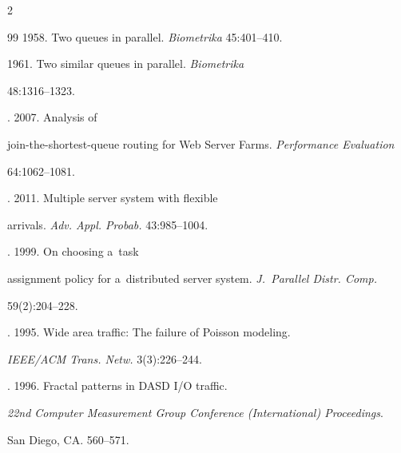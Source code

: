 \begin{multicols}{2}
{{\begin{thebibliography}{99}
     1958. Two queues in parallel. \textit{Biometrika} 45:401--410.


    




     1961. Two similar queues in parallel. \textit{Biometrika} 


48:1316--1323.





   




    . 2007. Analysis of 


    join-the-shortest-queue routing for Web Server Farms. \textit{Performance Evaluation} 


64:1062--1081.




    . 2011. Multiple server system with flexible 


arrivals. \textit{Adv. Appl. Probab.} 43:985--1004.








    




    . 1999. On choosing a~task 


assignment policy for a~distributed server system. \textit{J.~Parallel Distr. Comp.} 


59(2):204--228.




    . 1995. Wide area traffic: The failure of Poisson modeling. 


\textit{IEEE/ACM Trans. Netw.} 3(3):226--244.




    . 1996. Fractal patterns in DASD I/O traffic. 


\textit{22nd Computer  Measurement Group Conference (International) Proceedings}. 


San Diego, CA. 560--571.





\end{thebibliography}}}
\end{multicols}
